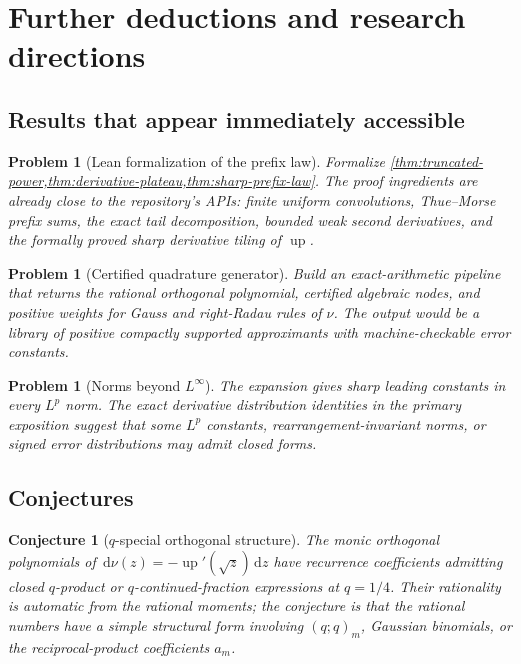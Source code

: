 \documentclass[11pt]{article}
\newtheorem{conjecture}[theorem]{Conjecture}
\newtheorem{problem}[theorem]{Problem}
\theoremstyle{definition}
\theoremstyle{remark}
\newcommand{\Up}{\operatorname{up}}
\newcommand{\dd}{\,\mathrm d}
\begin{document}
\section{Further deductions and research directions}
\label{sec:future}

\subsection{Results that appear immediately accessible}

\begin{problem}[Lean formalization of the prefix law]
Formalize \cref{thm:truncated-power,thm:derivative-plateau,thm:sharp-prefix-law}.
The proof ingredients are already close to the repository's APIs: finite uniform
convolutions, Thue--Morse prefix sums, the exact tail decomposition, bounded weak
second derivatives, and the formally proved sharp derivative tiling of $\Up$.
\end{problem}

\begin{problem}[Certified quadrature generator]
Build an exact-arithmetic pipeline that returns the rational orthogonal polynomial,
certified algebraic nodes, and positive weights for Gauss and right-Radau rules of
$\nu$.  The output would be a library of positive compactly supported approximants with
machine-checkable error constants.
\end{problem}

\begin{problem}[Norms beyond $L^\infty$]
The expansion gives sharp leading constants in every $L^p$ norm.  The exact derivative
distribution identities in the primary exposition suggest that some $L^p$ constants,
rearrangement-invariant norms, or signed error distributions may admit closed forms.
\end{problem}

\subsection{Conjectures}

\begin{conjecture}[$q$-special orthogonal structure]
\label{conj:q-orthogonal}
The monic orthogonal polynomials of
$\dd\nu(z)=-\Up'(\sqrt z)\dd z$ have recurrence coefficients admitting closed
$q$-product or $q$-continued-fraction expressions at $q=1/4$.  Their rationality is
automatic from the rational moments; the conjecture is that the rational numbers have a
simple structural form involving $(q;q)_m$, Gaussian binomials, or the reciprocal-product
coefficients $a_m$.
\end{conjecture}
\end{document}
